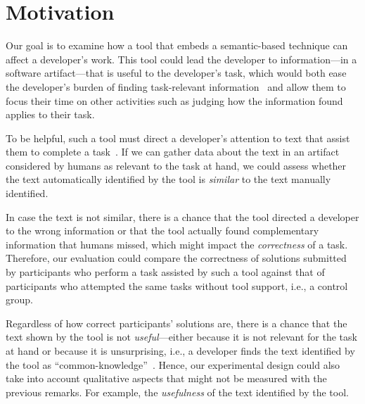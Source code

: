 


\section{Motivation}
\label{cp6:method}



Our goal is to examine how a tool that embeds a semantic-based technique can affect a developer's work.
This tool could lead the developer to information---in a software artifact---that is useful to the developer's task,
which would both ease the developer's burden of finding task-relevant information~\cite{Robillard2015}
and allow them to focus their time on other activities such as judging how the information found applies to their task.





To be helpful, such a tool must direct a developer's attention to text that assist them to complete a task~\cite{Robillard2015}.
If we can gather data about the text in an artifact considered by humans as relevant to the task at hand, 
we could assess whether the text automatically identified by the tool is \textit{similar} to the text manually identified. 


In case the text is not similar,
there is a chance that the tool directed a developer to the wrong information or that 
the tool actually found complementary information that humans missed, which might impact the \textit{correctness} of a task. 
Therefore, our evaluation could compare the correctness of solutions submitted by participants who perform a task assisted by such a
tool against that of participants who attempted the same tasks without tool support, i.e., a control group.


Regardless of how correct participants' solutions are, there is a chance that the text shown by the tool is not \textit{useful}---either because it is not relevant for the task at hand or because it is unsurprising, i.e., 
a developer finds the text identified by the tool as ``common-knowledge''~\cite{cwalina2008, Robillard2015}. Hence, our experimental design could also take into account qualitative aspects 
that might not be measured with the previous remarks. For example, the \textit{usefulness} of the text identified by the tool. 





